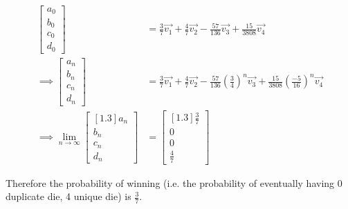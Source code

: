 \documentclass[11pt]{article} %
\begin{document}
\begin{align*}
\begin{bmatrix} a_0 \\ b_0 \\ c_0 \\ d_0 \end{bmatrix} & = \frac{3}{7}\vec{v_1} + \frac{4}{7}\vec{v_2} - \frac{57}{136}\vec{v_3} + \frac{15}{3808}\vec{v_4} \\
\implies \begin{bmatrix} a_n \\ b_n \\ c_n \\ d_n \end{bmatrix} & = \frac{3}{7}\vec{v_1} + \frac{4}{7}\vec{v_2} - \frac{57}{136}\left(\frac{3}{4}\right)^n\vec{v_3} + \frac{15}{3808}\left(\frac{-5}{16}\right)^n\vec{v_4} \\
\implies \lim_{n \to \infty} \begin{bmatrix}[1.3] a_n \\ b_n \\ c_n \\ d_n \end{bmatrix} & = \begin{bmatrix}[1.3] \frac{3}{7} \\ 0 \\ 0 \\ \frac{4}{7} \end{bmatrix}
\end{align*}

Therefore the probability of winning (i.e. the probability of eventually having 0 duplicate die, 4 unique die) is $\frac{3}{7}$.
\end{document}
